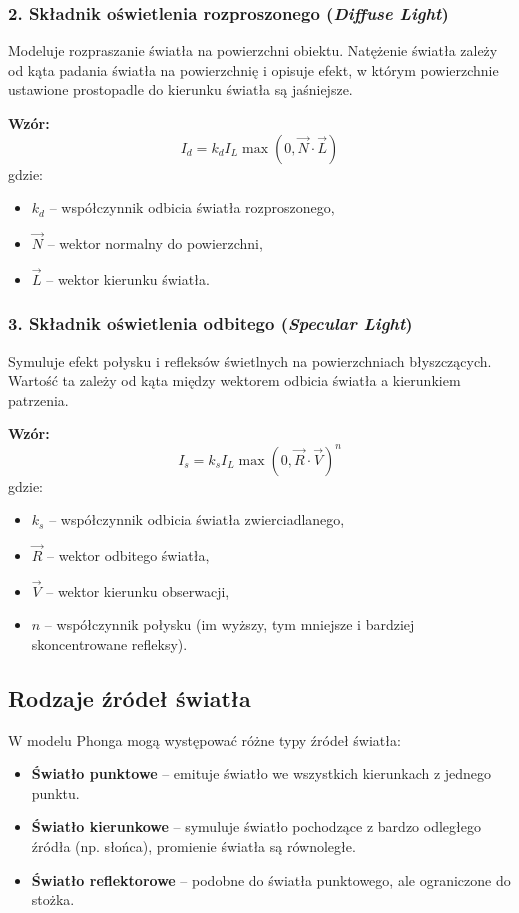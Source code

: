 \subsubsection{2. Składnik oświetlenia rozproszonego (\textit{Diffuse Light})}
Modeluje rozpraszanie światła na powierzchni obiektu. Natężenie światła zależy od kąta padania światła na powierzchnię i opisuje efekt, w którym powierzchnie ustawione prostopadle do kierunku światła są jaśniejsze.

\textbf{Wzór:}
\begin{equation}
I_d = k_d I_L \max(0, \vec{N} \cdot \vec{L})
\end{equation}
gdzie:
\begin{itemize}
    \item \( k_d \) – współczynnik odbicia światła rozproszonego,
    \item \( \vec{N} \) – wektor normalny do powierzchni,
    \item \( \vec{L} \) – wektor kierunku światła.
\end{itemize}

\subsubsection{3. Składnik oświetlenia odbitego (\textit{Specular Light})}
Symuluje efekt połysku i refleksów świetlnych na powierzchniach błyszczących. Wartość ta zależy od kąta między wektorem odbicia światła a kierunkiem patrzenia.

\textbf{Wzór:}
\begin{equation}
I_s = k_s I_L \max(0, \vec{R} \cdot \vec{V})^n
\end{equation}
gdzie:
\begin{itemize}
    \item \( k_s \) – współczynnik odbicia światła zwierciadlanego,
    \item \( \vec{R} \) – wektor odbitego światła,
    \item \( \vec{V} \) – wektor kierunku obserwacji,
    \item \( n \) – współczynnik połysku (im wyższy, tym mniejsze i bardziej skoncentrowane refleksy).
\end{itemize}

\subsection{Rodzaje źródeł światła}
W modelu Phonga mogą występować różne typy źródeł światła:
\begin{itemize}
    \item \textbf{Światło punktowe} – emituje światło we wszystkich kierunkach z jednego punktu.
    \item \textbf{Światło kierunkowe} – symuluje światło pochodzące z bardzo odległego źródła (np. słońca), promienie światła są równoległe.
    \item \textbf{Światło reflektorowe} – podobne do światła punktowego, ale ograniczone do stożka.
\end{itemize}

